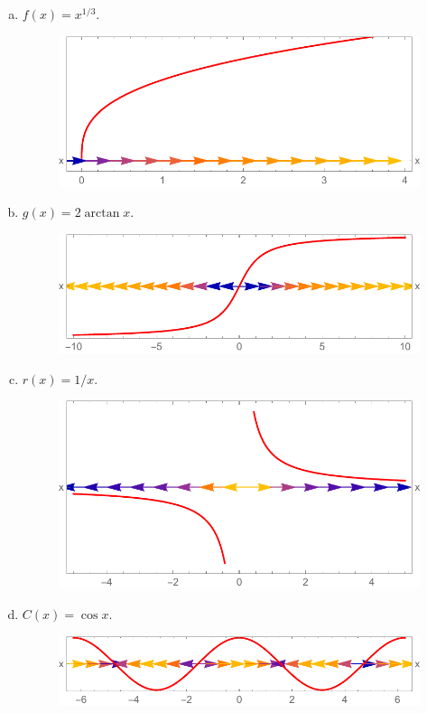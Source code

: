 \documentclass[conference]{IEEEtran}
\begin{document}
\begin{enumerate}[a)]
	\item $f(x) = x^{1/3}$.
		\begin{figure}[H]
			\centering
			\includegraphics[scale=0.4]{./img/p1-3_a}
		\end{figure}
	\item $g(x) = 2\arctan{x}$.
		\begin{figure}[H]
			\centering
			\includegraphics[scale=0.4]{./img/p1-3_b}
		\end{figure}
	\item $r(x) = 1/x$.
		\begin{figure}[H]
			\centering
			\includegraphics[scale=0.4]{./img/p1-3_c}
		\end{figure}
	\item $C(x) = \cos{x}$.
		\begin{figure}[H]
			\centering
			\includegraphics[scale=0.4]{./img/p1-3_d}
		\end{figure}
\end{enumerate}
\end{document}

